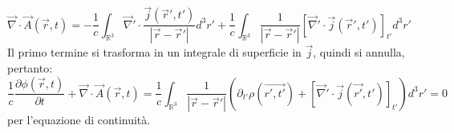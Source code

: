 \documentclass[10pt, a4paper]{scrartcl}
\numberwithin{equation}{subsection}
\theoremstyle{style1}
\begin{document}
\[
\vec{\nabla }\cdot \vec{A}(\vec{r},t) = -\frac{1}{c}\int_{\mathbb{R}^3} \vec{\nabla }' \cdot \frac{\vec{j}(\vec{r}',t')}{\left\lvert \vec{r}- \vec{r}'\right\rvert }d^3 r' + \frac{1}{c} \int_{\mathbb{R}^3} \frac{1}{\left\lvert \vec{r}-\vec{r}' \right\rvert } \left[ \vec{\nabla }' \cdot \vec{j}(\vec{r}',t') \right] _{t'}  d^3 r'
\] 
Il primo termine si trasforma in un integrale di superficie in $\vec{j}$, quindi si annulla, pertanto:
\begin{equation}
	\frac{1}{c} \frac{\partial \phi (\vec{r},t)}{\partial t} +\vec{\nabla }\cdot \vec{A}(\vec{r},t) = \frac{1}{c}\int_{\mathbb{R}^3} \frac{1}{\left\lvert \vec{r}-\vec{r}' \right\rvert } \left(\partial _{t'} \rho (\vec{r',t'}) + \left[ \vec{\nabla }'\cdot \vec{j}(\vec{r'},t') \right] _{t'} \right) d^3 r' = 0
\end{equation}
per l'equazione di continuit\`a.
\end{document}
